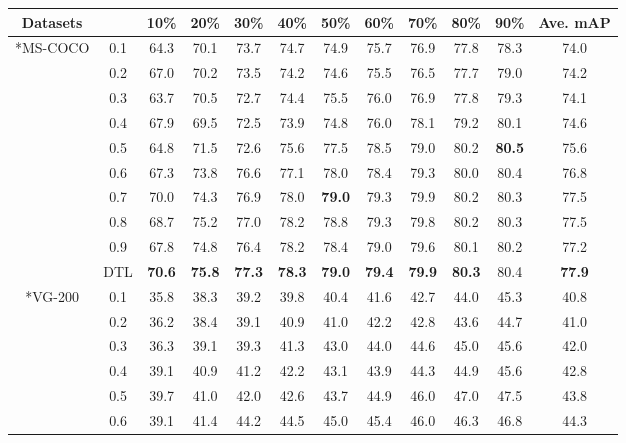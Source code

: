 \begin{table*}[!t]
  \centering
  \small
  \begin{tabular}{c|c|ccccccccc|c}
  \hline
  \centering Datasets &   & 10\% & 20\% & 30\% & 40\% & 50\% & 60\% & 70\% & 80\% & 90\% & Ave. mAP \\
  \hline
  \hline
  \centering \multirow{9}*{MS-COCO} & 0.1 & 64.3 & 70.1 & 73.7 & 74.7 & 74.9 & 75.7 & 76.9 & 77.8 & 78.3 & 74.0 \\
  \centering ~ & 0.2 & 67.0 & 70.2 & 73.5 & 74.2 & 74.6 & 75.5 & 76.5 & 77.7 & 79.0 & 74.2 \\
  \centering ~ & 0.3 & 63.7 & 70.5 & 72.7 & 74.4 & 75.5 & 76.0 & 76.9 & 77.8 & 79.3 & 74.1 \\
  \centering ~ & 0.4 & 67.9 & 69.5 & 72.5 & 73.9 & 74.8 & 76.0 & 78.1 & 79.2 & 80.1 & 74.6 \\
  \centering ~ & 0.5 & 64.8 & 71.5 & 72.6 & 75.6 & 77.5 & 78.5 & 79.0 & 80.2 & \textbf{80.5} & 75.6 \\
  \centering ~ & 0.6 & 67.3 & 73.8 & 76.6 & 77.1 & 78.0 & 78.4 & 79.3 & 80.0 & 80.4 & 76.8 \\
  \centering ~ & 0.7 & 70.0 & 74.3 & 76.9 & 78.0 & \textbf{79.0} & 79.3 & 79.9 & 80.2 & 80.3 & 77.5 \\
  \centering ~ & 0.8 & 68.7 & 75.2 & 77.0 & 78.2 & 78.8 & 79.3 & 79.8 & 80.2 & 80.3 & 77.5 \\
  \centering ~ & 0.9 & 67.8 & 74.8 & 76.4 & 78.2 & 78.4 & 79.0 & 79.6 & 80.1 & 80.2 & 77.2 \\
  \hline
  \centering ~ & DTL & \textbf{70.6} & \textbf{75.8} & \textbf{77.3} & \textbf{78.3} & \textbf{79.0} & \textbf{79.4} & \textbf{79.9} & \textbf{80.3} & 80.4 & \textbf{77.9} \\
  \hline
  \hline
  \centering \multirow{9}*{VG-200} & 0.1 & 35.8 & 38.3 & 39.2 & 39.8 & 40.4 & 41.6 & 42.7 & 44.0 & 45.3 & 40.8 \\
  \centering ~ & 0.2 & 36.2 & 38.4 & 39.1 & 40.9 & 41.0 & 42.2 & 42.8 & 43.6 & 44.7 & 41.0 \\
  \centering ~ & 0.3 & 36.3 & 39.1 & 39.3 & 41.3 & 43.0 & 44.0 & 44.6 & 45.0 & 45.6 & 42.0 \\
  \centering ~ & 0.4 & 39.1 & 40.9 & 41.2 & 42.2 & 43.1 & 43.9 & 44.3 & 44.9 & 45.6 & 42.8 \\
  \centering ~ & 0.5 & 39.7 & 41.0 & 42.0 & 42.6 & 43.7 & 44.9 & 46.0 & 47.0 & 47.5 & 43.8 \\
  \centering ~ & 0.6 & 39.1 & 41.4 & 44.2 & 44.5 & 45.0 & 45.4 & 46.0 & 46.3 & 46.8 & 44.3 \\

\end{tabular}
\end{table*}
